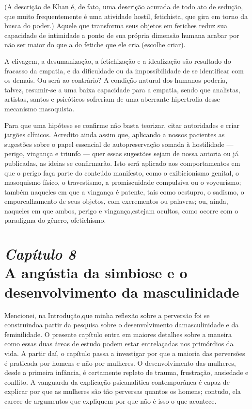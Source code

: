 (A descrição de Khan é, de fato, uma descrição acurada de todo ato de
sedução,\idxseduc{} que muito frequentemente é uma atividade hostil, fetichista,
que gira em torno da busca do poder.) Aquele que transforma seus
objetos em fetiches reduz sua capacidade de intimidade a ponto de sua
própria dimensão humana acabar por não ser maior do que a do fetiche
que ele cria (escolhe criar).

A clivagem, a desumanização, a fetichização e a idealização são
resultado do fracasso da empatia, e da dificuldade ou da
impossibilidade de se identificar com os demais. Ou será ao contrário?
A condição natural dos humanos poderia, talvez, resumir-se a uma baixa
capacidade para a empatia, sendo que analistas, artistas, santos e
psicóticos sofreriam de uma aberrante hipertrofia desse mecanismo\idxmasoq{}
masoquista.

Para que uma hipótese se confirme não basta teorizar, citar
autoridades e criar jargões clínicos. Acredito ainda assim que,
aplicando a nossos pacientes as sugestões sobre o papel essencial de
autopreservação somada à hostilidade\idxhost{} --- perigo, vingança\idxvinga{} e triunfo
--- quer essas sugestões sejam de nossa autoria ou já publicadas, as
ideias se confirmarão. Isto será aplicado aos comportamentos em que o
perigo faça parte do conteúdo manifesto, como o exibicionismo\idxexibi{} genital,
o masoquismo físico, o travestismo, a promiscuidade\idxpromiscomp{} compulsiva ou o
voyeurismo;\idxvoy{} também naqueles em que a vingança é patente, tais como o\idxdesfa[|)]
estupro,\idxestup{} o sadismo,\idxsadi{} o emporcalhamento de seus objetos, com excrementos\idxcopro{}
ou palavras; ou, ainda, naqueles em que ambos, perigo e vingança,\idxdesu[|)]
estejam ocultos, como ocorre com o paradigma do gênero, o\idxfetic[|)] fetichismo.


\chapter[\textbf{8}\quad A angústia da simbiose e o desenvolvimento\\\hspace*{6mm}
da masculinidade]{{\large\textit{Capítulo 8}}\\ A angústia da simbiose e o\\ desenvolvimento da masculinidade}


Mencionei, na Introdução,\idxangusimb[|(] que minha reflexão sobre a perversão foi se
construindo\idxangus[|(] a partir da pesquisa sobre o desenvolvimento da\idxmaessimb[|(]
masculinidade e da feminilidade. O presente capítulo entra em maiores
detalhes sobre a maneira como essas duas áreas de estudo podem estar
entrelaçadas nos primórdios da vida. A partir daí, o capítulo passa a
investigar por que a maioria das perversões é praticada por homens e
não por mulheres. O desenvolvimento das mulheres, desde a primeira
infância, é certamente repleto de trauma, frustração, ansiedade e
conflito. A vanguarda da explicação psicanalítica contemporânea é capaz
de explicar por que as mulheres são tão perversas quantos os homens;
contudo, ela carece de argumentos que expliquem por que não é isso o
que acontece.


